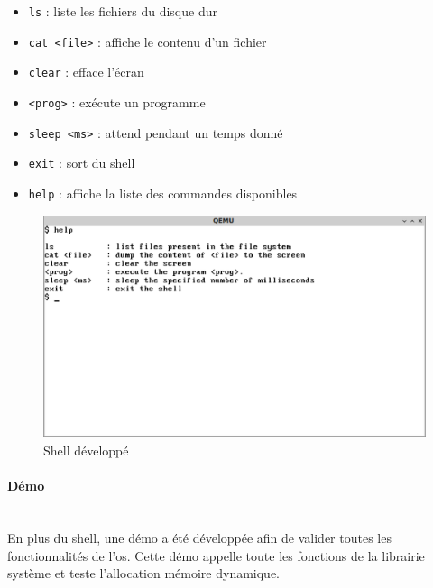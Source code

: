 \begin{itemize}[label=\textbullet]
	\item \texttt{ls}         : liste les fichiers du disque dur
	\item \texttt{cat <file>} : affiche le contenu d'un fichier
	\item \texttt{clear}      : efface l'écran
	\item \texttt{<prog>}     : exécute un programme
    \item \texttt{sleep <ms>} : attend pendant un temps donné 
    \item \texttt{exit}       : sort du shell
    \item \texttt{help}       : affiche la liste des commandes disponibles
\end{itemize}

\begin{figure}[!h]
  \centering
  \includegraphics[scale=.6]{images/shell.png}
  \caption{Shell développé}
  \label{mem_view_user}
\end{figure}

\paragraph{Démo} \mbox{} \\
En plus du shell, une démo a été développée afin de valider toutes les fonctionnalités
de l'\acrshort{os}. Cette démo appelle toute les fonctions de la librairie système
et teste l'allocation mémoire dynamique.